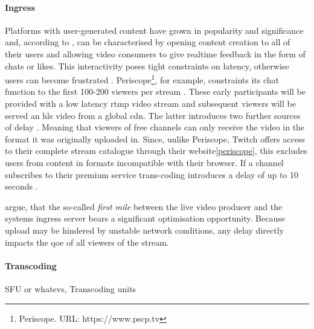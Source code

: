 \paragraph{Ingress}
Platforms with user-generated content have grown in popularity and significance and, according to \citet{twitch-case}, can be characterised by opening content creation to all of their users and allowing video consumers to give realtime feedback in the form of chats or likes. This interactivity poses tight constraints on latency, otherwise users can become frustrated \cite[\S5]{periscope-experience}. Periscope\footnote{\label{periscope}Periscope. URL:  {https://www.pscp.tv}}, for example, constraints its chat function to the first 100-200 viewers per stream \cite{anatomy-personalized-livestreaming}. These early participants will be provided with a low latency \gls{rtmp} video stream and subsequent viewers will be served an \gls{hls} video from a global \gls{cdn}. The latter introduces two further sources of delay \cite[\S2-3{periscope-experience}: 1) \gls{hls} segments the video into smaller files, so the duration of such a chunk adds to overall latency. 2) According to a network analysis by \citet{periscope-experience}, Periscope uses different \textit{Cloud Computing} providers for \gls{rtmp} ingress and \gls{cdn} egress. This means, traffic between their different providers adds to viewing latency.

Twitch\footnote{\label{twitch}Twitch. URL: {https://www.twitch.tv}}, on the other hand, reserves computationally expensive trans–coding of live streams for its premium users \cite[\S2]{twitch-measurement-study}. Meaning that viewers of free channels can only receive the video in the format it was originally uploaded in. Since, unlike Periscope, Twitch offers access to their complete stream catalogue through their website\vref{periscope}, this excludes users from content in formats incompatible with their browser. If a channel subscribes to their premium service trans-coding introduces a delay of up to 10 seconds \cite[\S4.2]{twitch-measurement-study}.

\citet[\S{III.A}]{content-harvest-network} argue, that the so-called \textit{first mile} between the live video producer and the systems ingress server bears a significant optimisation opportunity. Because upload may be hindered by unstable network conditions, any delay directly impacts the \gls{qoe} of all viewers of the stream.

\paragraph{Transcoding}
SFU or whatevs, Transcoding units

